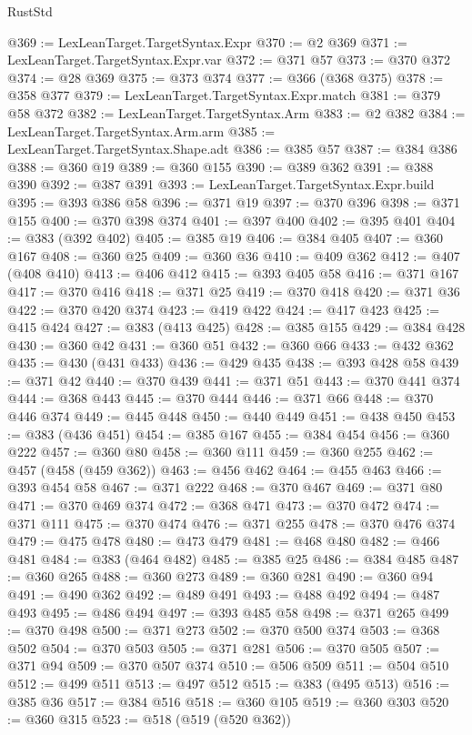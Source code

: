 \begin{lexlean}{RustStd}
\begin{coremodule}
@369 := LexLeanTarget.TargetSyntax.Expr
@370 := @2 @369
@371 := LexLeanTarget.TargetSyntax.Expr.var
@372 := @371 @57
@373 := @370 @372
@374 := @28 @369
@375 := @373 @374
@377 := @366 (@368 @375)
@378 := @358 @377
@379 := LexLeanTarget.TargetSyntax.Expr.match
@381 := @379 @58 @372
@382 := LexLeanTarget.TargetSyntax.Arm
@383 := @2 @382
@384 := LexLeanTarget.TargetSyntax.Arm.arm
@385 := LexLeanTarget.TargetSyntax.Shape.adt
@386 := @385 @57
@387 := @384 @386
@388 := @360 @19
@389 := @360 @155
@390 := @389 @362
@391 := @388 @390
@392 := @387 @391
@393 := LexLeanTarget.TargetSyntax.Expr.build
@395 := @393 @386 @58
@396 := @371 @19
@397 := @370 @396
@398 := @371 @155
@400 := @370 @398 @374
@401 := @397 @400
@402 := @395 @401
@404 := @383 (@392 @402)
@405 := @385 @19
@406 := @384 @405
@407 := @360 @167
@408 := @360 @25
@409 := @360 @36
@410 := @409 @362
@412 := @407 (@408 @410)
@413 := @406 @412
@415 := @393 @405 @58
@416 := @371 @167
@417 := @370 @416
@418 := @371 @25
@419 := @370 @418
@420 := @371 @36
@422 := @370 @420 @374
@423 := @419 @422
@424 := @417 @423
@425 := @415 @424
@427 := @383 (@413 @425)
@428 := @385 @155
@429 := @384 @428
@430 := @360 @42
@431 := @360 @51
@432 := @360 @66
@433 := @432 @362
@435 := @430 (@431 @433)
@436 := @429 @435
@438 := @393 @428 @58
@439 := @371 @42
@440 := @370 @439
@441 := @371 @51
@443 := @370 @441 @374
@444 := @368 @443
@445 := @370 @444
@446 := @371 @66
@448 := @370 @446 @374
@449 := @445 @448
@450 := @440 @449
@451 := @438 @450
@453 := @383 (@436 @451)
@454 := @385 @167
@455 := @384 @454
@456 := @360 @222
@457 := @360 @80
@458 := @360 @111
@459 := @360 @255
@462 := @457 (@458 (@459 @362))
@463 := @456 @462
@464 := @455 @463
@466 := @393 @454 @58
@467 := @371 @222
@468 := @370 @467
@469 := @371 @80
@471 := @370 @469 @374
@472 := @368 @471
@473 := @370 @472
@474 := @371 @111
@475 := @370 @474
@476 := @371 @255
@478 := @370 @476 @374
@479 := @475 @478
@480 := @473 @479
@481 := @468 @480
@482 := @466 @481
@484 := @383 (@464 @482)
@485 := @385 @25
@486 := @384 @485
@487 := @360 @265
@488 := @360 @273
@489 := @360 @281
@490 := @360 @94
@491 := @490 @362
@492 := @489 @491
@493 := @488 @492
@494 := @487 @493
@495 := @486 @494
@497 := @393 @485 @58
@498 := @371 @265
@499 := @370 @498
@500 := @371 @273
@502 := @370 @500 @374
@503 := @368 @502
@504 := @370 @503
@505 := @371 @281
@506 := @370 @505
@507 := @371 @94
@509 := @370 @507 @374
@510 := @506 @509
@511 := @504 @510
@512 := @499 @511
@513 := @497 @512
@515 := @383 (@495 @513)
@516 := @385 @36
@517 := @384 @516
@518 := @360 @105
@519 := @360 @303
@520 := @360 @315
@523 := @518 (@519 (@520 @362))

\end{coremodule}
\end{lexlean}
